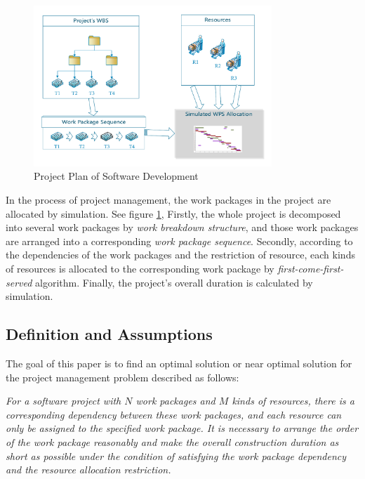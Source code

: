 \begin{figure}[!ht]
  \centering
  \includegraphics[width=0.8\textwidth]{figures/simu.pdf}
  \caption{Project Plan of Software Development}
  \label{fig:simu}
\end{figure}



 In the process of project management, the work packages in the project are
 allocated by simulation. See figure \ref{fig:simu}, Firstly, the whole project
 is decomposed into several work packages by \emph{work breakdown structure},
 and those work packages are arranged into a corresponding \emph{work package
   sequence}. Secondly, according to the dependencies of the work packages and
 the restriction of resource, each kinds of resources is allocated to the
 corresponding work package by \emph{first-come-first-served}
 algorithm. Finally, the project's overall duration is calculated by simulation.



\subsection{Definition and Assumptions}
%
The goal of this paper is to find an optimal solution or near optimal
solution for the project management problem described as follows:


\emph{
  For a software project with $N$ work packages and $M$ kinds of resources,
  there is a corresponding dependency between these work packages, and each
  resource can only be assigned to the specified work package.  It is necessary
  to arrange the order of the work package reasonably and make the overall
  construction duration as short as possible under the condition of satisfying
  the work package dependency and the resource allocation restriction.
}

